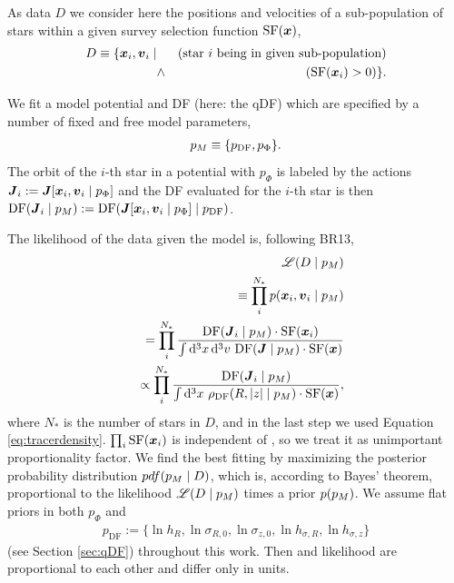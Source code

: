 As data $D$ we consider here the positions and velocities of a sub-population of stars within a given survey selection function $\text{SF}(\boldsymbol{x})$,
\begin{eqnarray*}
D  \equiv \{ \boldsymbol{x}_i,\boldsymbol{v}_i \mid && \text{(star $i$ being in given sub-population)}\nonumber\\
&\wedge& (\text{SF}(\boldsymbol{x}_i) > 0) \}.
\end{eqnarray*}

We fit a model potential and DF (here: the qDF) which are specified by a number of fixed and free model parameters,
\begin{eqnarray*}
p_M \equiv \{ p_\text{DF} , p_\Phi \}.
\end{eqnarray*}
The orbit of the $i$-th star in a potential with $p_\Phi$ is labeled by the actions $\boldsymbol{J}_i := \boldsymbol{J}[\boldsymbol{x}_i,\boldsymbol{v}_i\mid p_{\Phi}]$ and the DF evaluated for the $i$-th star is then $\text{DF}(\boldsymbol{J}_i \mid p_M) := \text{DF}(\boldsymbol{J}[\boldsymbol{x}_i,\boldsymbol{v}_i\mid p_{\Phi}] \mid p_\text{DF})$.

The likelihood of the data given the model is, following BR13,
\begin{eqnarray}
&&\mathscr{L}(D \mid p_M) \nonumber\\
&&\equiv \prod_i^{N_*} p(\boldsymbol{x}_i,\boldsymbol{v}_i \mid p_M) \nonumber\\
&&= \prod_i^{N_*} \frac{\text{DF}(\boldsymbol{J}_i \mid p_M) \cdot \text{SF}(\boldsymbol{x}_i)}{\int \mathop{}\!\mathrm{d^3} x \mathop{}\!\mathrm{d^3} v \  \text{DF}(\boldsymbol{J} \mid p_M) \cdot \text{SF}(\boldsymbol{x})}\nonumber\\
&&\propto \prod_i^{N_*} \frac{\text{DF}(\boldsymbol{J}_i \mid p_M)}{\int \mathop{}\!\mathrm{d^3} x \  \rho_\text{DF}(R,|z| \mid p_M) \cdot \text{SF}(\boldsymbol{x})}, \label{eq:prob}
\end{eqnarray}
where $N_*$ is the number of stars in $D$, and in the last step we used Equation \ref{eq:tracerdensity}. $\prod_i\text{SF}(\boldsymbol{x}_i)$ is independent of \pmodel{}, so we treat it as unimportant proportionality factor. We find the best fitting \pmodel{} by maximizing the posterior probability distribution $pdf{}(p_M \mid D)$, which is, according to Bayes' theorem, proportional to the likelihood $\mathscr{L}(D\mid p_M)$ times a prior $p(p_M)$. We assume flat priors in both $p_\Phi$ and
\begin{eqnarray}
p_\text{DF} := \{ \ln h_R, \ln \sigma_{R,0}, \ln \sigma_{z,0}, \ln h_{\sigma,R}, \ln h_{\sigma,z} \} \label{eq:p_DF}
\end{eqnarray}
(see Section \ref{sec:qDF}) throughout this work. Then \pdf{} and likelihood are proportional to each other and differ only in units.

